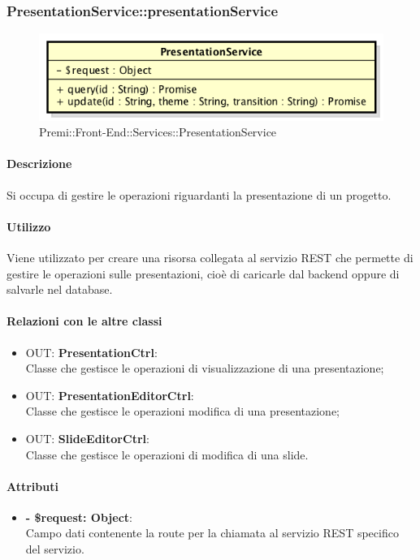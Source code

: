 		\subsubsection{PresentationService::presentationService}
		\begin{figure}[h]
			\centering
				\includegraphics[width=0.5\linewidth]{img/premi_front_end_services_presentationservice}
			\caption[Premi::Front-End::Services::PresentationService]{Premi::Front-End::Services::PresentationService}
		\end{figure}
		
		\paragraph{Descrizione}
		Si occupa di gestire le operazioni riguardanti la presentazione di un progetto.
		
		\paragraph{Utilizzo}
		Viene utilizzato per creare una risorsa collegata al servizio REST che permette di gestire le operazioni sulle presentazioni, cioè di caricarle dal backend oppure di salvarle nel database.
		
		\paragraph{Relazioni con le altre classi}
		\begin{itemize}
			\item OUT: \textbf{PresentationCtrl}:\\
			Classe che gestisce le operazioni di visualizzazione di una presentazione;
			\item OUT: \textbf{PresentationEditorCtrl}:\\
			Classe che gestisce le operazioni modifica di una presentazione;
			\item OUT: \textbf{SlideEditorCtrl}:\\
			Classe che gestisce le operazioni di modifica di una slide.
		\end{itemize}
		
		\paragraph{Attributi}
		\begin{itemize}
			\item \textbf{- \$request: Object}:\\
			Campo dati contenente la route per la chiamata al servizio REST specifico del servizio.
		\end{itemize}	
		
